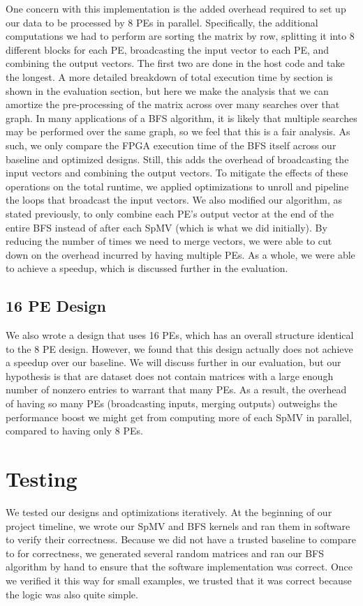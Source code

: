 \documentclass[10pt]{article}
\begin{document}
One concern with this implementation is the added overhead required to set up
our data to be processed by 8 PEs in parallel. Specifically, the additional
computations we had to perform are sorting the matrix by row, splitting it into
8 different blocks for each PE, broadcasting the input vector to each PE, and
combining the output vectors. The first two are done in the host code and take
the longest. A more detailed breakdown of total execution time by section is
shown in the evaluation section, but here we make the analysis that we can
amortize the pre-processing of the matrix across over many searches over that
graph. In many applications of a BFS algorithm, it is likely that multiple
searches may be performed over the same graph, so we feel that this is a fair
analysis. As such, we only compare the FPGA execution time of the BFS itself
across our baseline and optimized designs. Still, this adds the overhead of
broadcasting the input vectors and combining the output vectors. To mitigate the
effects of these operations on the total runtime, we applied optimizations to
unroll and pipeline the loops that broadcast the input vectors. We also modified our algorithm,
as stated previously, to only combine each PE's output vector at the end of the entire BFS instead
of after each SpMV (which is what we did initially). By reducing the number of times we need to merge
vectors, we were able to cut down on the overhead incurred by having multiple PEs. As a whole, we 
were able to achieve a speedup, which is discussed further in the evaluation.

\subsection{16 PE Design}
We also wrote a design that uses 16 PEs, which has an overall structure
identical to the 8 PE design. However, we found that this design actually does
not achieve a speedup over our baseline. We will discuss further in our
evaluation, but our hypothesis is that are dataset does not contain matrices
with a large enough number of nonzero entries to warrant that many PEs. As a
result, the overhead of having so many PEs (broadcasting inputs, merging
outputs) outweighs the performance boost we might get from computing more of
each SpMV in parallel, compared to having only 8 PEs.

\section{Testing}
We tested our designs and optimizations iteratively. At the beginning of our project timeline, we 
wrote our SpMV and BFS kernels and ran them in software to verify their correctness. Because we did not
have a trusted baseline to compare to for correctness, we generated several random matrices and 
ran our BFS algorithm by hand to ensure that the software implementation was correct. Once we verified
it this way for small examples, we trusted that it was correct because the logic was also quite simple.
\end{document}

